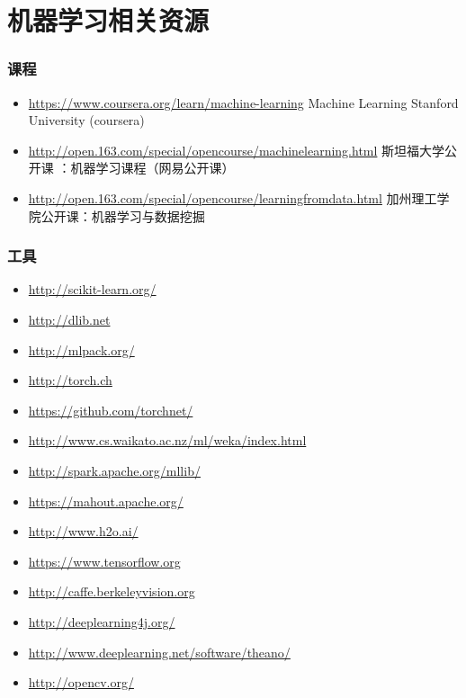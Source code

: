 \documentclass{beamer}
\begin{document}
\section{机器学习相关资源}
\label{sec-6}
\begin{frame}
\frametitle{课程}
\label{sec-6-1}


\begin{itemize}
\item \href{https://www.coursera.org/learn/machine-learning}{https://www.coursera.org/learn/machine-learning}  Machine Learning Stanford University (coursera)
\item \href{http://open.163.com/special/opencourse/machinelearning.html}{http://open.163.com/special/opencourse/machinelearning.html}  斯坦福大学公开课 ：机器学习课程（网易公开课）
\item \href{http://open.163.com/special/opencourse/learningfromdata.html}{http://open.163.com/special/opencourse/learningfromdata.html} 加州理工学院公开课：机器学习与数据挖掘
\end{itemize}
\end{frame}
\begin{frame}
\frametitle{工具}
\label{sec-6-2}


\begin{itemize}
\item \href{http://scikit-learn.org/}{http://scikit-learn.org/}
\item \href{http://dlib.net}{http://dlib.net}
\item \href{http://mlpack.org/}{http://mlpack.org/}
\item \href{http://torch.ch}{http://torch.ch}
\item \href{https://github.com/torchnet/}{https://github.com/torchnet/}
\item \href{http://www.cs.waikato.ac.nz/ml/weka/index.html}{http://www.cs.waikato.ac.nz/ml/weka/index.html}
\item \href{http://spark.apache.org/mllib/}{http://spark.apache.org/mllib/}
\item \href{https://mahout.apache.org/}{https://mahout.apache.org/}
\item \href{http://www.h2o.ai/}{http://www.h2o.ai/}
\item \href{https://www.tensorflow.org}{https://www.tensorflow.org}
\item \href{http://caffe.berkeleyvision.org}{http://caffe.berkeleyvision.org}
\item \href{http://deeplearning4j.org/}{http://deeplearning4j.org/}
\item \href{http://www.deeplearning.net/software/theano/}{http://www.deeplearning.net/software/theano/}
\item \href{http://opencv.org/}{http://opencv.org/}
\end{itemize}
\end{frame}
\end{document}
